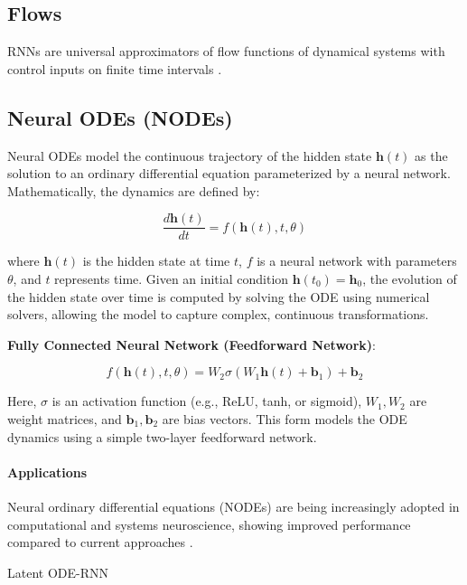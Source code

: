 \documentclass{article}
\theoremstyle{definition}
\theoremstyle{remark}
\begin{document}
\subsection{Flows}
RNNs are universal approximators of flow  functions of dynamical systems  with control inputs on finite time intervals  \citep{aguiar2023}.




\subsection{Neural ODEs (NODEs)}
Neural ODEs\citep{chen2018neural} model the continuous trajectory of the hidden state \( \mathbf{h}(t) \) as the solution to an ordinary differential equation parameterized by a neural network. Mathematically, the dynamics are defined by:

\[
\frac{d \mathbf{h}(t)}{dt} = f(\mathbf{h}(t), t, \theta)
\]

where \( \mathbf{h}(t) \) is the hidden state at time \( t \), \( f \) is a neural network with parameters \( \theta \), and \( t \) represents time. Given an initial condition \( \mathbf{h}(t_0) = \mathbf{h}_0 \), the evolution of the hidden state over time is computed by solving the ODE using numerical solvers, allowing the model to capture complex, continuous transformations.

\textbf{Fully Connected Neural Network (Feedforward Network)}:

\[
f(\mathbf{h}(t), t, \theta) = W_2 \sigma(W_1 \mathbf{h}(t) + \mathbf{b}_1) + \mathbf{b}_2
\]

Here, \( \sigma \) is an activation function (e.g., ReLU, tanh, or sigmoid), \( W_1, W_2 \) are weight matrices, and \( \mathbf{b}_1, \mathbf{b}_2 \) are bias vectors.
 This form models the ODE dynamics using a simple two-layer feedforward network.



\paragraph{Applications}
Neural ordinary differential equations (NODEs) are being increasingly adopted in computational and systems neuroscience, showing improved performance compared to current approaches \citep{kim2021inferring,geenjaar2023learning,sedler2023expressive,elgazzar2024universal}.

Latent ODE-RNN  \citep{rubanova2019latent}
\end{document}
